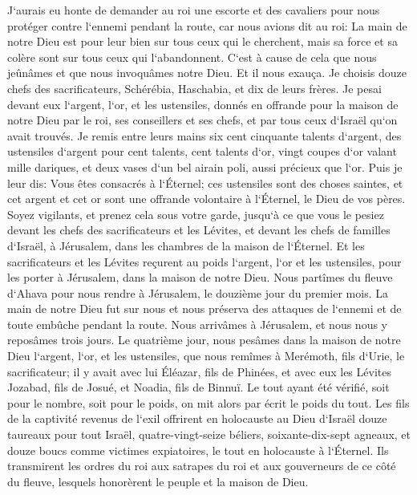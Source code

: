 \verse J`aurais eu honte de demander au roi une escorte et des cavaliers pour nous protéger contre l`ennemi pendant la route, car nous avions dit au roi: La main de notre Dieu est pour leur bien sur tous ceux qui le cherchent, mais sa force et sa colère sont sur tous ceux qui l`abandonnent. 
\verse C`est à cause de cela que nous jeûnâmes et que nous invoquâmes notre Dieu. Et il nous exauça. 
\verse Je choisis douze chefs des sacrificateurs, Schérébia, Haschabia, et dix de leurs frères. 
\verse Je pesai devant eux l`argent, l`or, et les ustensiles, donnés en offrande pour la maison de notre Dieu par le roi, ses conseillers et ses chefs, et par tous ceux d`Israël qu`on avait trouvés. 
\verse Je remis entre leurs mains six cent cinquante talents d`argent, des ustensiles d`argent pour cent talents, cent talents d`or, 
\verse vingt coupes d`or valant mille dariques, et deux vases d`un bel airain poli, aussi précieux que l`or. 
\verse Puis je leur dis: Vous êtes consacrés à l`Éternel; ces ustensiles sont des choses saintes, et cet argent et cet or sont une offrande volontaire à l`Éternel, le Dieu de vos pères. 
\verse Soyez vigilants, et prenez cela sous votre garde, jusqu`à ce que vous le pesiez devant les chefs des sacrificateurs et les Lévites, et devant les chefs de familles d`Israël, à Jérusalem, dans les chambres de la maison de l`Éternel. 
\verse Et les sacrificateurs et les Lévites reçurent au poids l`argent, l`or et les ustensiles, pour les porter à Jérusalem, dans la maison de notre Dieu. 
\verse Nous partîmes du fleuve d`Ahava pour nous rendre à Jérusalem, le douzième jour du premier mois. La main de notre Dieu fut sur nous et nous préserva des attaques de l`ennemi et de toute embûche pendant la route. 
\verse Nous arrivâmes à Jérusalem, et nous nous y reposâmes trois jours. 
\verse Le quatrième jour, nous pesâmes dans la maison de notre Dieu l`argent, l`or, et les ustensiles, que nous remîmes à Merémoth, fils d`Urie, le sacrificateur; il y avait avec lui Éléazar, fils de Phinées, et avec eux les Lévites Jozabad, fils de Josué, et Noadia, fils de Binnuï. 
\verse Le tout ayant été vérifié, soit pour le nombre, soit pour le poids, on mit alors par écrit le poids du tout. 
\verse Les fils de la captivité revenus de l`exil offrirent en holocauste au Dieu d`Israël douze taureaux pour tout Israël, quatre-vingt-seize béliers, soixante-dix-sept agneaux, et douze boucs comme victimes expiatoires, le tout en holocauste à l`Éternel. 
\verse Ils transmirent les ordres du roi aux satrapes du roi et aux gouverneurs de ce côté du fleuve, lesquels honorèrent le peuple et la maison de Dieu. 

